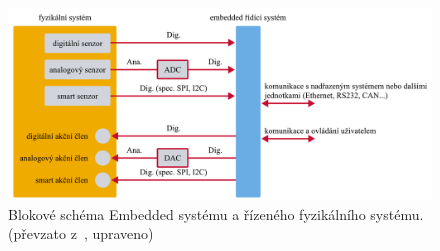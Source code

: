 \documentclass[a4paper, twoside, 11pt]{article}
\newcommand{\fbar}{\FloatBarrier}
\begin{document}
	\begin{figure}[htbp!]
		\centering
			\includegraphics[width=1\textwidth]{src/pdf/embedded-system-scheme.pdf} 
			\caption{Blokové schéma Embedded systému a řízeného fyzikálního systému. (převzato z~\cite{juan-fpgas}, upraveno)}
			\label{fig:embedded-system-scheme}
	\end{figure}

		\fbar
\end{document}

